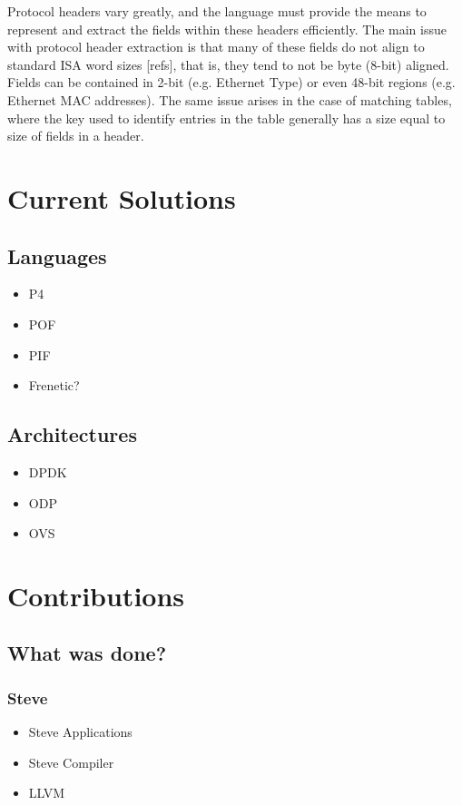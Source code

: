 Protocol headers vary greatly, and the language must provide the means to 
represent and extract the fields within these headers efficiently. The main 
issue with protocol header extraction is that many of these fields do not 
align to standard ISA word sizes [refs], that is, they tend to not be byte 
(8-bit) aligned. Fields can be contained in 2-bit (e.g. Ethernet Type) or even 
48-bit regions (e.g. Ethernet MAC addresses). The same issue arises in the case
of matching tables, where the key used to identify entries in the table 
generally has a size equal to size of fields in a header.

\section{Current Solutions}

\subsection{Languages}
\begin{itemize}
\item P4
\item POF
\item PIF
\item Frenetic?
\end{itemize}

\subsection{Architectures}
\begin{itemize}
\item DPDK
\item ODP
\item OVS
\end{itemize}

\section{Contributions}

\subsection{What was done?}
\subsubsection{Steve}
\begin{itemize}
\item Steve Applications
\item Steve Compiler
\item LLVM
\end{itemize}

